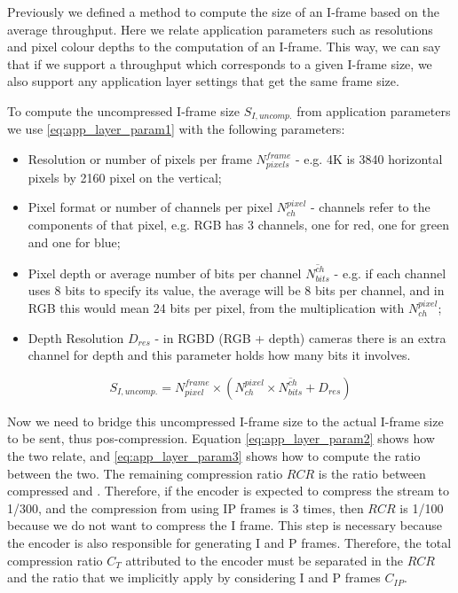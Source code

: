 \label{sec:bridge_to_application}

Previously we defined a method to compute the size of an I-frame based on the average throughput. Here we relate application parameters such as resolutions and pixel colour depths to the computation of an I-frame. This way, we can say that if we support a throughput which corresponds to a given I-frame size, we also support any application layer settings that get the same frame size.


To compute the uncompressed I-frame size $S_{I,uncomp.}$ from application parameters we use \eqref{eq:app_layer_param1} with the following parameters:
\begin{itemize}
    \item Resolution or number of pixels per frame $N_{pixels}^{frame}$ - e.g. 4K is 3840 horizontal pixels by 2160 pixel on the vertical;
    \item Pixel format or number of channels per pixel $N_{ch}^{pixel}$ - channels refer to the components of that pixel, e.g. RGB has 3 channels, one for red, one for green and one for blue;
    \item Pixel depth or average number of bits per channel $\overline{N_{bits}^{ch}}$ - e.g. if each channel uses 8 bits to specify its value, the average will be 8 bits per channel, and in RGB this would mean 24 bits per pixel, from the multiplication with $N_{ch}^{pixel}$;
    \item Depth Resolution $D_{res}$ - in RGBD (RGB + depth) cameras there is an extra channel for depth and this parameter holds how many bits it involves.
\end{itemize}

\begin{equation} \label{eq:app_layer_param1}
    S_{I, uncomp.} = N_{pixel}^{frame} \times \left(N_{ch}^{pixel} \times \overline{N_{bits}^{ch}} + D_{res}\right)
\end{equation}

Now we need to bridge this uncompressed I-frame size to the actual I-frame size to be sent, thus pos-compression. Equation \eqref{eq:app_layer_param2} shows how the two relate, and \eqref{eq:app_layer_param3} shows how to compute the ratio between the two. The remaining compression ratio $RCR$ is the ratio between compressed and . Therefore, if the encoder is expected to compress the stream to 1/300, and the compression from using IP frames is 3 times, then $RCR$ is 1/100 because we do not want to compress the I frame. This step is necessary because the encoder is also responsible for generating I and P frames. Therefore, the total compression ratio $C_T$ attributed to the encoder must be separated in the $RCR$ and the ratio that we implicitly apply by considering I and P frames $C_{IP}$.

